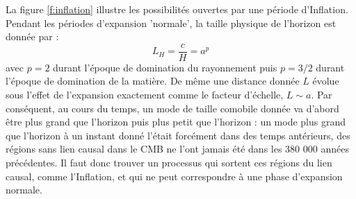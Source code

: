 La figure \ref{f:inflation} illustre les possibilités ouvertes par une période d'Inflation. Pendant les périodes d'expansion 'normale', la taille physique de l'horizon est donnée par :
\begin{equation}
L_H=\frac{c}{H}=a^p
\end{equation}
avec $p=2$ durant l'époque de domination du rayonnement puis $p=3/2$ durant l'époque de domination de la matière. De même une distance donnée $L$ évolue sous l'effet de l'expansion exactement comme le facteur d'échelle, $L\sim a$. Par conséquent, au cours du temps, un mode de taille comobile donnée va d'abord être plus grand que l'horizon puis plus petit que l'horizon : un mode plus grand que l'horizon à un instant donné l'était forcément dans des temps antérieurs, des régions sans lien causal dans le CMB ne l'ont jamais été dans les 380 000 années précédentes. Il faut donc trouver un processus qui sortent ces régions du lien causal, comme l'Inflation, et qui ne peut correspondre à une phase d'expansion normale.

